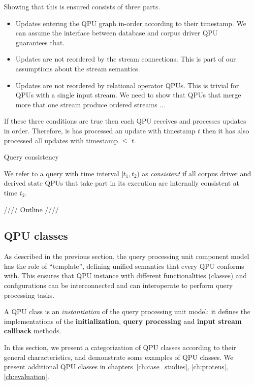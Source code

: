 Showing that this is ensured consists of three parts.
\begin{itemize}
  \item Updates entering the QPU graph in-order according to their timestamp.
  We can assume the interface between database and corpus driver QPU guarantees that.
  \item Updates are not reordered by the stream connections.
  This is part of our assumptions about the stream semantics.
  \item Updates are not reordered by relational operator QPUs.
  This is trivial for QPUs with a single input stream.
  We need to show that QPUs that merge more that one stream produce ordered streams ...
\end{itemize}

If these three conditions are true then each QPU receives and processes updates in order.
Therefore, is has processed an update with timestamp $t$ then it has also processed all updates with timestamp $\leq$ $t$.

\medskip
\noindent
Query consistency

\noindent
We refer to a query with time interval $[t_1, t_2)$ as \textit{consistent} if all corpus driver and derived state QPUs
that take part in its execution are internally consistent at time $t_2$.

\noindent
//// Outline ////


\subsection{QPU classes}
\label{sec:qpu_classes}

As described in the previous section, the query processing unit component model has the role of ``template'',
defining unified semantics that every QPU conforms with.
This ensures that QPU instance with different functionalities (classes) and configurations can be interconnected and
can interoperate to perform query processing tasks.

A QPU class is an \textit{instantiation} of the query processing unit model:
it defines the implementations of the \textbf{initialization}, \textbf{query processing} and \textbf{input stream callback}
methods.

In this section, we present a categorization of QPU classes according to their general characteristics,
and demonstrate some examples of QPU classes.
We present additional QPU classes in chapters~\ref{ch:case_studies}, \ref{ch:proteus}, \ref{ch:evaluation}.

